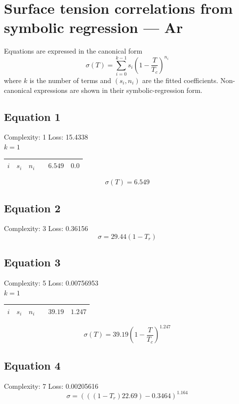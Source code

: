 \documentclass[11pt]{article}
\begin{document}
\section*{Surface tension correlations from symbolic regression — Ar}
\noindent Equations are expressed in the canonical form
\[
  \sigma(T) = \sum_{i=0}^{k-1} s_i \left(1 - \frac{T}{T_c}\right)^{\!n_i}
\]
where $k$ is the number of terms and $(s_i, n_i)$ are the fitted coefficients.
Non-canonical expressions are shown in their symbolic-regression form.

\subsection*{Equation 1}
\noindent Complexity: 1 \quad Loss: 15.4338 \\[4pt]
\noindent $k = 1$ \\[2pt]
\begin{center}
\begin{tabular}{ccc}
\toprule
$i$ & $s_i$ & $n_i$ \
 & $6.549$ & $0.0$ \\
\bottomrule
\end{tabular}
\end{center}
\[
\sigma(T) = 6.549
\]

\subsection*{Equation 2}
\noindent Complexity: 3 \quad Loss: 0.36156 \\[4pt]
\[
\sigma = 29.44 (1 - T_r)
\]

\subsection*{Equation 3}
\noindent Complexity: 5 \quad Loss: 0.00756953 \\[4pt]
\noindent $k = 1$ \\[2pt]
\begin{center}
\begin{tabular}{ccc}
\toprule
$i$ & $s_i$ & $n_i$ \
 & $39.19$ & $1.247$ \\
\bottomrule
\end{tabular}
\end{center}
\[
\sigma(T) = 39.19 \left(1 - \dfrac{T}{T_{\!c}}\right)^{1.247}
\]

\subsection*{Equation 4}
\noindent Complexity: 7 \quad Loss: 0.00205616 \\[4pt]
\[
\sigma = \left(((1 - T_r) 22.69) - 0.3464\right)^{1.164}
\]
\end{document}
